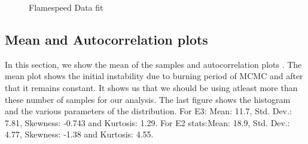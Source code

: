  \begin{figure}[H]
  \ContinuedFloat
  \caption{Flamespeed Data fit}
\end{figure}



\subsection{Mean and Autocorrelation plots}

In this section, we show the mean of the samples and autocorrelation plots . The mean plot shows the initial instability due to burning period of MCMC and after that it remains constant. It shows us that we should be using atleast more than these number of samples for our analysis. The last figure shows the histogram and the various parameters of the distribution. For E3: Mean:  11.7, Std. Dev.: 7.81, Skewness:  -0.743 and Kurtosis:  1.29. For E2 stats:Mean:  18.9, Std. Dev.:  4.77, Skewness:  -1.38 and Kurtosis:  4.55.


